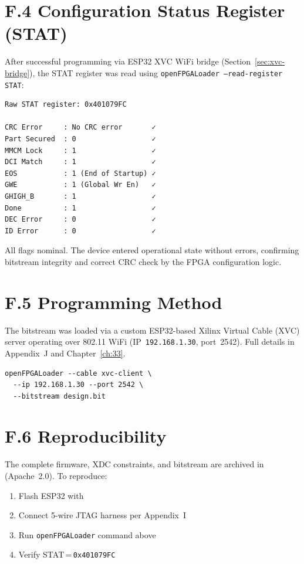 \section*{F.4 Configuration Status Register (STAT)}
\label{sec:appF-stat}

After successful programming via ESP32 XVC WiFi bridge
(Section~\ref{sec:xvc-bridge}), the STAT register was read using
\texttt{openFPGALoader --read-register STAT}:

\begin{verbatim}
Raw STAT register: 0x401079FC

CRC Error     : No CRC error       ✓
Part Secured  : 0                  ✓
MMCM Lock     : 1                  ✓
DCI Match     : 1                  ✓
EOS           : 1 (End of Startup) ✓
GWE           : 1 (Global Wr En)   ✓
GHIGH_B       : 1                  ✓
Done          : 1                  ✓
DEC Error     : 0                  ✓
ID Error      : 0                  ✓
\end{verbatim}

All flags nominal. The device entered operational state without errors,
confirming bitstream integrity and correct CRC check by the FPGA configuration
logic.

\section*{F.5 Programming Method}\label{sec:xvc-bridge}

The bitstream was loaded via a custom ESP32-based Xilinx Virtual Cable (XVC)
server operating over 802.11 WiFi (IP~\texttt{192.168.1.30}, port~2542).
Full details in Appendix~J and Chapter~\ref{ch:33}.

\begin{verbatim}
openFPGALoader --cable xvc-client \
  --ip 192.168.1.30 --port 2542 \
  --bitstream design.bit
\end{verbatim}

\section*{F.6 Reproducibility}
\label{sec:appF-repro}

The complete firmware, XDC constraints, and bitstream are archived in
 (Apache~2.0). To reproduce:

\begin{enumerate}
  \item Flash ESP32 with 
  \item Connect 5-wire JTAG harness per Appendix~I
  \item Run \texttt{openFPGALoader} command above
  \item Verify STAT\,=\,\texttt{0x401079FC}
\end{enumerate}


